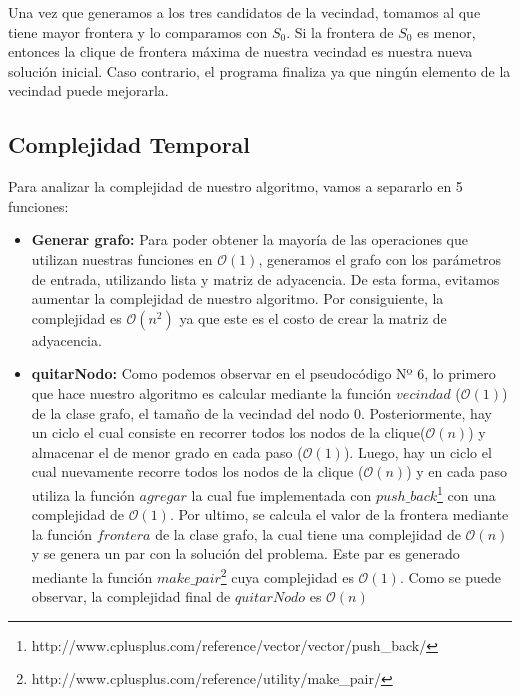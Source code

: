 Una vez que generamos a los tres candidatos de la vecindad, tomamos al que tiene mayor frontera y lo comparamos con $S_{0}$. Si la frontera de $S_{0}$ es menor, entonces la clique de frontera máxima de nuestra vecindad es nuestra nueva solución inicial. Caso contrario, el programa finaliza ya que ningún elemento de la vecindad puede mejorarla.

\subsection{Complejidad Temporal}
Para analizar la complejidad de nuestro algoritmo, vamos a separarlo en 5 funciones:
\begin{itemize}
\item \textbf{Generar grafo:} \newline
Para poder obtener la mayoría de las operaciones que utilizan nuestras funciones en $\mathcal{O}(1)$, generamos el grafo con los parámetros de entrada, utilizando lista y matriz de adyacencia. De esta forma, evitamos aumentar la complejidad de nuestro algoritmo. Por consiguiente, la complejidad es $\mathcal{O}(n^{2})$ ya que este es el costo de crear la matriz de adyacencia.

\item \textbf{quitarNodo:} \newline
Como podemos observar en el pseudocódigo Nº 6, lo primero que hace nuestro algoritmo es calcular mediante la función $vecindad$ ($\mathcal{O}(1)$) de la clase grafo, el tamaño de la vecindad del nodo 0. Posteriormente, hay un ciclo el cual consiste en recorrer todos los nodos de la clique($\mathcal{O}(n)$) y almacenar el de menor grado en cada paso ($\mathcal{O}(1)$).
\newline
Luego, hay un ciclo el cual nuevamente recorre todos los nodos de la clique ($\mathcal{O}(n)$) y en cada paso utiliza la función $agregar$ la cual fue implementada con $push\_back$\footnote{http://www.cplusplus.com/reference/vector/vector/push\_back/} con una complejidad de $\mathcal{O}(1)$.
\newline
Por ultimo, se calcula el valor de la frontera mediante la función $frontera$ de la clase grafo, la cual tiene una complejidad de $\mathcal{O}(n)$ y se genera un par con la solución del problema. Este par es generado mediante la función $make\_pair$\footnote{http://www.cplusplus.com/reference/utility/make\_pair/} cuya complejidad es $\mathcal{O}(1)$.
\newline
Como se puede observar, la complejidad final de $quitarNodo$ es $\mathcal{O}(n)$


\end{itemize}
